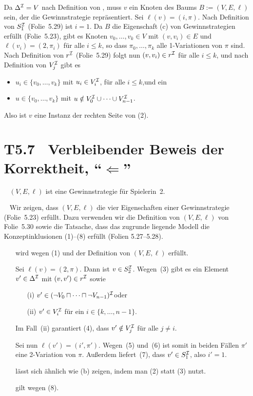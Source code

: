 \documentclass[fontsize=11pt, twoside=false, numbers=autoenddot]{scrbook}
\begin{document}
Da $\Delta^\mathcal{I} = V$ nach Definition von \Imc,
muss $v$ ein Knoten des Baums $B := (V,E,\ell)$ sein,
der die Gewinnstrategie repräsentiert.
Sei $\ell(v) = (i,\pi)$.
Nach Definition von $S_1^\mathcal{I}$ (Folie~5.29) ist $i=1$.
Da $B$ die Eigenschaft (c) von Gewinnstrategien erfüllt (Folie~5.23),
gibt es Knoten $v_0,\dots,v_k \in V$ mit $(v,v_i) \in E$ und $\ell(v_i) = (2,\pi_i)$
für alle $i \leq k$, so dass $\pi_0,\dots,\pi_k$ alle 1-Variationen von $\pi$ sind.
Nach Definition von $r^\mathcal{I}$ (Folie~5.29) folgt nun $(v,v_i) \in r^\mathcal{I}$ für alle  $i \leq k$,
und nach Definition von $V_j^\mathcal{I}$ gibt es
%
\begin{itemize}
  \item
    $u_i \in \{v_0,\dots,v_k\}$ mit $u_i \in V_i^\mathcal{I}$, für alle $i \leq k$,\quad und ein
  \item
    $u \in \{v_0,\dots,v_k\}$ mit $u \notin V_0^\mathcal{I} \cup \dots \cup V_{n-1}^\mathcal{I}$.
\end{itemize}
%
Also ist $v$ eine Instanz der rechten Seite von (2).
\qedhere

\section*{T5.7~ Verbleibender Beweis der Korrektheit, {\boldmath "`$\Leftarrow$"'}}

~ $(V,E,\ell)$ ist eine Gewinnstrategie für Spielerin~2.

\parII
{}~
Wir zeigen, dass $(V,E,\ell)$ die vier Eigenschaften einer Gewinnstrategie (Folie~5.23) 
erfüllt. Dazu verwenden wir die Definition von $(V,E,\ell)$ von Folie~5.30
sowie die Tatsache, dass das zugrunde liegende Modell \Imc
die Konzeptinklusionen (1)--(8) erfüllt (Folien 5.27--5.28).
%
\begin{enumerate}
  \item[\textsfbf{(a)}]
    wird wegen (1) und der Definition von $(V,E,\ell)$ erfüllt.
  \item[\textsfbf{(b)}]
    Sei $\ell(v) = (2,\pi)$.
    Dann ist $v \in S_2^\mathcal{I}$.
    Wegen~(3) gibt es ein Element $v' \in \Delta^\mathcal{I}$
    mit $(v,v') \in r^\mathcal{I}$
    sowie 
    \begin{enumerate}
      \item[(i)] 
        $v' \in (\lnot V_0 \sqcap \dots \sqcap \lnot V_{n-1})^\mathcal{I}$\quad oder
      \item[(ii)] 
        $v' \in V_i^\mathcal{I}$ für ein $i \in \{k,\dots,n-1\}$.
    \end{enumerate}
    Im Fall~(ii) garantiert (4), dass $v' \notin V_j^\mathcal{I}$ für alle $j \neq i$.
    
    Sei nun $\ell(v') = (i',\pi')$.
    Wegen~(5) und~(6) ist somit in beiden Fällen $\pi'$ eine 2-Variation von $\pi$.
    Außerdem liefert~(7), dass $v' \in S_1^\mathcal{I}$, also $i'=1$.
  \item[\textsfbf{(c)}]
    lässt sich ähnlich wie (b) zeigen, indem man (2) statt (3) nutzt.
  \item[\textsfbf{(d)}]
    gilt wegen (8).
\qedhere
\end{enumerate}
\end{document}

